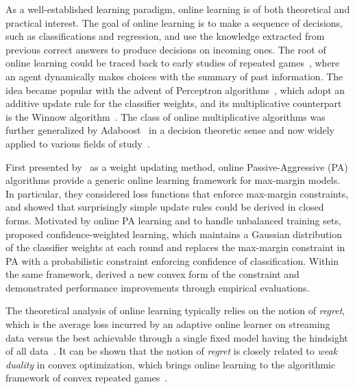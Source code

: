 \documentclass[twoside,11pt]{article}
\begin{document}
As a well-established learning paradigm, online learning is of both theoretical and practical interest. The goal of online learning is to make a sequence of decisions, such as classifications and regression, and use the knowledge extracted from previous correct answers to produce decisions on incoming ones. The root of online learning could be traced back to early studies of repeated games~\citep{hannan1957approximation}, where an agent dynamically makes choices with the summary of past information. The idea became popular with the advent of Perceptron algorithms~\citep{rosenblatt1958perceptron}, which adopt an additive update rule for the classifier weights, and its multiplicative counterpart is the Winnow algorithm~\citep{littlestone1988learning}. The class of online multiplicative algorithms was further generalized by Adaboost~\citep{freund1997decision} in a decision theoretic sense and now widely applied to various fields of study~\citep{arora2012multiplicative}.

First presented by~\citet{crammer2006pa} as a weight updating method, online Passive-Aggressive (PA) algorithms provide a generic online learning framework for max-margin models. In particular, they considered loss functions that enforce max-margin constraints, and showed that surprisingly simple update rules could be derived in closed forms. Motivated by online PA learning and to handle unbalanced training sets, \cite{dredze2008confidence} proposed confidence-weighted learning, which maintains a Gaussian distribution of the classifier weights at each round and replaces the max-margin constraint in PA with a probabilistic constraint enforcing confidence of classification. Within the same framework, \cite{pereira2008exact} derived a new convex form of the constraint and demonstrated performance improvements through empirical evaluations.

The theoretical analysis of online learning typically relies on the notion of \emph{regret}, which is the average loss incurred by an adaptive online learner on streaming data versus the best achievable through a single fixed model having the hindsight of all data~\citep{murphy2012machine_reget}. It can be shown that the notion of \emph{regret} is closely related to \emph{weak duality} in convex optimization, which brings online learning to the algorithmic framework of convex repeated games~\citep{shalev2006convex}.
\end{document}
